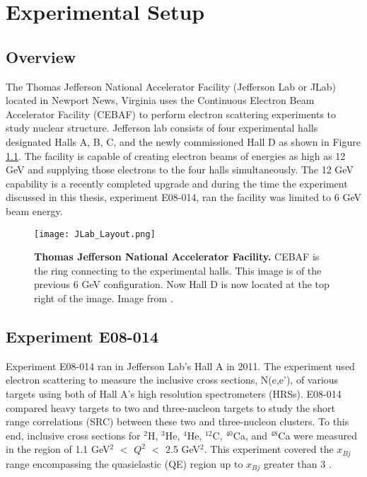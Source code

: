 \chapter{Experimental Setup} %
\label{ch:experiment} %

\section{Overview}
\label{sec:overview}

The Thomas Jefferson National Accelerator Facility (Jefferson Lab or JLab) located in Newport News, Virginia uses the Continuous Electron Beam Accelerator Facility (CEBAF) to perform electron scattering experiments to study nuclear structure. Jefferson lab consists of four experimental halls designated Halls A, B, C, and the newly commissioned Hall D as shown in Figure \ref{fig:jlab}. The facility is capable of creating electron beams of energies as high as 12 GeV and supplying those electrons to the four halls simultaneously. The 12 GeV capability is a recently completed upgrade and during the time the experiment discussed in this thesis, experiment E08-014, ran the facility was limited to 6 GeV beam energy.  

\begin{figure}[!ht]
\begin{center}
\texttt{[image: JLab\_Layout.png]}
\end{center}
\caption[Thomas Jefferson National Accelerator Facility]{
{\bf{Thomas Jefferson National Accelerator Facility.}} CEBAF is the ring connecting to the experimental halls. This image is of the previous 6 GeV configuration. Now Hall D is now located at the top right of the image. Image from \cite{Article:HallA}.}
\label{fig:jlab}
\end{figure}

\section{Experiment E08-014}
\label{sec:x>2}
Experiment E08-014 ran in Jefferson Lab's Hall A in 2011. The experiment used electron scattering to measure the inclusive cross sections, N(e,e'), of various targets using both of Hall A's high resolution spectrometers (HRSs). E08-014 compared heavy targets to two and three-nucleon targets to study the short range correlations (SRC) between these two and three-nucleon clusters. To this end, inclusive cross sections for $^2$H, $^3$He, $^4$He, $^{12}$C, $^{40}$Ca, and $^{48}$Ca were measured in the region of 1.1 GeV$^2$ $<$ $Q^2$ $<$ 2.5 GeV$^2$. This experiment covered the $x_{Bj}$ range encompassing the quasielastic (QE) region up to $x_{Bj}$ greater than 3 \cite{Thesis:Ye} \cite{src_website}. 

